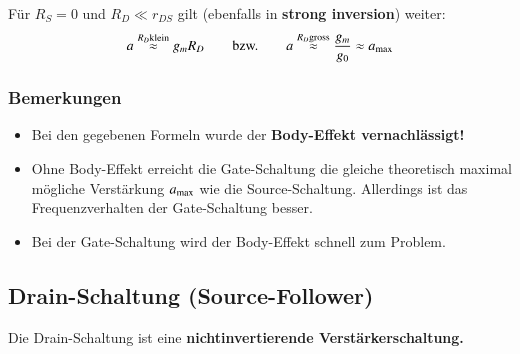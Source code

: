 Für $R_S = 0$ und $R_D \ll r_{DS}$ gilt (ebenfalls in \textbf{strong inversion}) weiter: 
\[
    a \overset{R_D \text{klein}}{\approx} g_m R_D \qquad \text{bzw.} \qquad a \overset{R_D \text{gross}}{\approx} \frac{g_m}{g_0} \approx a_{\rm max}
\]


\subsubsection{Bemerkungen}
\begin{itemize}
    \item Bei den gegebenen Formeln wurde der \textbf{Body-Effekt vernachlässigt!}
    \item Ohne Body-Effekt erreicht die Gate-Schaltung die gleiche theoretisch maximal mögliche Verstärkung $a_{\rm max}$ wie die Source-Schaltung.
        Allerdings ist das Frequenzverhalten der Gate-Schaltung besser.
    \item Bei der Gate-Schaltung wird der Body-Effekt schnell zum Problem.
\end{itemize}



\subsection{Drain-Schaltung (Source-Follower)}

Die Drain-Schaltung ist eine \textbf{nichtinvertierende Verstärkerschaltung.}

\smallskip

